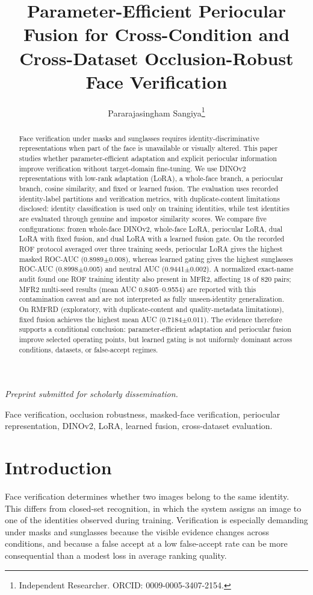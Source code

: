 \documentclass[10pt,journal,compsoc]{IEEEtran}
\title{Parameter-Efficient Periocular Fusion for Cross-Condition and Cross-Dataset Occlusion-Robust Face Verification}
\author{Pararajasingham Sangiya\thanks{Independent Researcher. ORCID: 0009-0005-3407-2154.}}
\begin{document}
\maketitle
\noindent\textit{Preprint submitted for scholarly dissemination.}\par
\begin{abstract}
Face verification under masks and sunglasses requires identity-discriminative representations when part of the face is unavailable or visually altered. This paper studies whether parameter-efficient adaptation and explicit periocular information improve verification without target-domain fine-tuning. We use DINOv2 representations with low-rank adaptation (LoRA), a whole-face branch, a periocular branch, cosine similarity, and fixed or learned fusion. The evaluation uses recorded identity-label partitions and verification metrics, with duplicate-content limitations disclosed: identity classification is used only on training identities, while test identities are evaluated through genuine and impostor similarity scores. We compare five configurations: frozen whole-face DINOv2, whole-face LoRA, periocular LoRA, dual LoRA with fixed fusion, and dual LoRA with a learned fusion gate. On the recorded ROF protocol averaged over three training seeds, periocular LoRA gives the highest masked ROC-AUC (0.8989$\pm$0.008), whereas learned gating gives the highest sunglasses ROC-AUC (0.8998$\pm$0.005) and neutral AUC (0.9441$\pm$0.002). A normalized exact-name audit found one ROF training identity also present in MFR2, affecting 18 of 820 pairs; MFR2 multi-seed results (mean AUC 0.8405--0.9554) are reported with this contamination caveat and are not interpreted as fully unseen-identity generalization. On RMFRD (exploratory, with duplicate-content and quality-metadata limitations), fixed fusion achieves the highest mean AUC (0.7184$\pm$0.011). The evidence therefore supports a conditional conclusion: parameter-efficient adaptation and periocular fusion improve selected operating points, but learned gating is not uniformly dominant across conditions, datasets, or false-accept regimes.
\end{abstract}
\begin{IEEEkeywords}
Face verification, occlusion robustness, masked-face verification, periocular representation, DINOv2, LoRA, learned fusion, cross-dataset evaluation.
\end{IEEEkeywords}

\section{Introduction}
Face verification determines whether two images belong to the same identity. This differs from closed-set recognition, in which the system assigns an image to one of the identities observed during training. Verification is especially demanding under masks and sunglasses because the visible evidence changes across conditions, and because a false accept at a low false-accept rate can be more consequential than a modest loss in average ranking quality.
\end{document}
